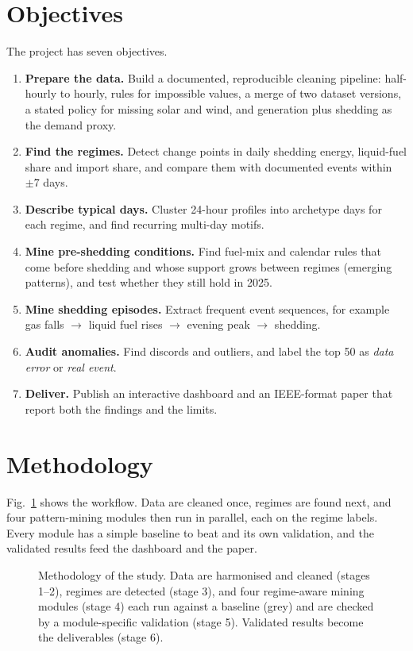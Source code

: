 \documentclass[10pt,a4paper]{article}
\begin{document}
\section{Objectives}
The project has seven objectives.
\begin{enumerate}
  \item \textbf{Prepare the data.} Build a documented, reproducible cleaning pipeline: half-hourly to hourly, rules for impossible values, a merge of two dataset versions, a stated policy for missing solar and wind, and generation plus shedding as the demand proxy.
  \item \textbf{Find the regimes.} Detect change points in daily shedding energy, liquid-fuel share and import share, and compare them with documented events within $\pm 7$ days.
  \item \textbf{Describe typical days.} Cluster 24-hour profiles into archetype days for each regime, and find recurring multi-day motifs.
  \item \textbf{Mine pre-shedding conditions.} Find fuel-mix and calendar rules that come before shedding and whose support grows between regimes (emerging patterns), and test whether they still hold in 2025.
  \item \textbf{Mine shedding episodes.} Extract frequent event sequences, for example gas falls $\to$ liquid fuel rises $\to$ evening peak $\to$ shedding.
  \item \textbf{Audit anomalies.} Find discords and outliers, and label the top 50 as \emph{data error} or \emph{real event}.
  \item \textbf{Deliver.} Publish an interactive dashboard and an IEEE-format paper that report both the findings and the limits.
\end{enumerate}

\section{Methodology}
\label{sec:method}
Fig.~\ref{fig:method} shows the workflow. Data are cleaned once, regimes are found next, and four pattern-mining modules then run in parallel, each on the regime labels. Every module has a simple baseline to beat and its own validation, and the validated results feed the dashboard and the paper.

\begin{figure}[H]
\centering

\caption{Methodology of the study. Data are harmonised and cleaned (stages 1--2), regimes are detected (stage 3), and four regime-aware mining modules (stage 4) each run against a baseline (grey) and are checked by a module-specific validation (stage 5). Validated results become the deliverables (stage 6).}
\label{fig:method}
\end{figure}
\end{document}
